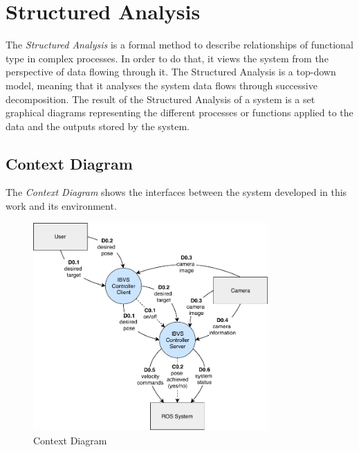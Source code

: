 
\newpage

\section{Structured Analysis}
\label{sec:sa}

The \emph{Structured Analysis} \cite{Janschek2011} is a formal method to describe relationships of functional type in complex processes. In order to do that, it views the system from the perspective of data flowing through it. The Structured Analysis is a top-down model, meaning that it analyses the system data flows through successive decomposition. The result of the Structured Analysis of a system is a set graphical diagrams representing the different processes or functions applied to the data and the outputs stored by the system.



\subsection{Context Diagram}
\label{sec:context-diagram}

The \emph{Context Diagram} shows the interfaces between the system developed in this work and its environment.

\begin{figure}[h]
	\caption{Context Diagram}
	\label{fig:sa_diag_01}
	\centering
	\includegraphics[width=0.8\textwidth]{content/chapter_03/images/sa_diagram_01.pdf}
\end{figure}

